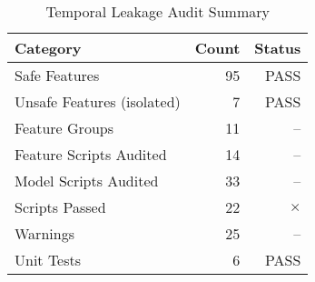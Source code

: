 
\begin{table}[htbp]
\centering
\caption{Temporal Leakage Audit Summary}
\label{tab:leakage_audit}
\begin{tabular}{@{} l r r @{}}
\toprule
\textbf{Category}  & \textbf{Count}  & \textbf{Status} \\
\midrule
Safe Features & 95 & PASS \\
Unsafe Features (isolated) & 7 & PASS \\
Feature Groups & 11 & -- \\
\midrule
Feature Scripts Audited & 14 & -- \\
Model Scripts Audited & 33 & -- \\
\midrule
Scripts Passed & 22 & $\times$ \\
Warnings & 25 & -- \\
\midrule
Unit Tests & 6 & PASS \\
\bottomrule
\end{tabular}
\end{table}